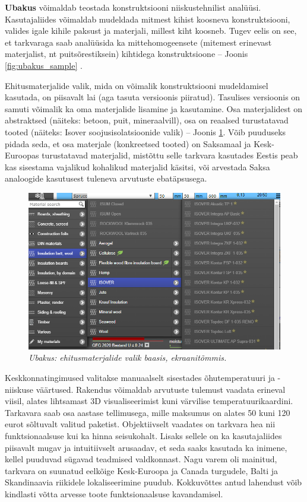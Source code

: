 \textbf{Ubakus} võimaldab teostada konstruktsiooni niiskustehnilist analüüsi. Kasutajaliides võimaldab 
mudeldada mitmest kihist koosneva konstruktsiooni, valides igale kihile paksust ja materjali, millest 
kiht koosneb. Tugev eelis on see, et tarkvaraga saab analüüsida ka mittehomogeensete (mitemest erinevast 
materjalist, nt puitsõrestiksein) kihtidega konstruktsioone -- Joonis \ref{fig:ubakus_sample} \cite{ubakus}.

Ehitusmaterjalide valik, mida on võimalik konstruktsiooni mudeldamisel kasutada, on piisavalt lai 
(aga tasuta versioonis piiratud). Tasulises versioonis on samuti võimalik ka oma materjalide 
lisamine ja kasutamine. Osa materjalidest on abstraktsed (näiteks: betoon, puit, mineraalvill), osa
on reaalsed turustatavad tooted (näiteks: Isover soojusisolatsioonide valik) -- Joonis \ref{fig:ubakus_materials}. Võib puuduseks pidada
seda, et osa materjale (konkreetsed tooted) on Saksamaal ja Kesk-Euroopas turustatavad materjalid, mistõttu selle 
tarkvara kasutades Eestis peab kas sisestama vajalikud kohalikud materjalid käsitsi, või arvestada Saksa analoogide
kasutusest tuleneva arvutuste ebatäpsusega.
\begin{figure}[ht]
    \centering
    \includegraphics[width=1\textwidth]{figures/problem_statement/03_ubakus_materials.png}
    \caption[Ubakus tarkvara materjalide valik, ekraanitõmmis]{\textit{Ubakus: ehitusmaterjalide valik baasis, ekraanitõmmis.}}
    \label{fig:ubakus_materials}
\end{figure}

Keskkonnatingimused valitakse manuaalselt sisestades õhutemperatuuri ja -niiskuse väärtused. Rakendus võimaldab arvutuste tulemust
vaadata erineval viisil, alates lihtsamast 3D visualiseerimist kuni värvilise temperatuurikaardini. Tarkavara saab osa aastase 
tellimusega, mille maksumus on alates 50 kuni 120 eurot sõltuvalt valitud paketist. Objektiivselt vaadates on tarkvara hea nii
funktsionaalsuse kui ka hinna seisukohalt. Lisaks sellele on ka kasutajaliides piisavalt mugav ja intuitiivselt arusaadav,
et seda saaks kasutada ka inimene, kellel puuduvad sügavad teadmised valdkonnast. Nagu varem oli mainitud, 
tarkvara on suunatud eelkõige Kesk-Euroopa ja Canada turgudele, Balti ja Skandinaavia riikidele lokaliseerimine puudub. Kokkuvõttes
antud lahendust võib kindlasti võtta arvesse toote funktsionaalsuse kavandamisel.

